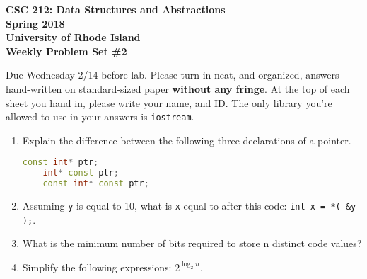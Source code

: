 \documentclass[11pt]{article}
\begin{document}
\thispagestyle{empty}

\begin{center}
    {\Large\bf CSC 212: Data Structures and Abstractions}\\
    \medskip
    {\Large\bf Spring 2018}\\
    \medskip
    {\Large\bf University of Rhode Island}\\
    \bigskip
    {\Large\bf Weekly Problem Set \#2}
\end{center}

Due Wednesday 2/14 before lab. Please turn in neat, and organized, answers hand-written on standard-sized paper \textbf{without any fringe}. At the top of each sheet you hand in, please write your name, and ID.
The only library you're allowed to use in your answers is \verb|iostream|.

\begin{enumerate}[leftmargin=*]

\item Explain the difference between the following three declarations of a pointer.  
\begin{lstlisting}[language=C++]
    const int* ptr;
    int* const ptr;
    const int* const ptr;
\end{lstlisting}

\item Assuming \lstinline|y| is equal to 10, what is \lstinline|x| equal to after this code: \verb|int x = *( &y );|.

\item What is the minimum number of bits required to store n distinct code values? 

\item Simplify the following expressions: 
\( 2^{\log_{2}n} \),


\end{enumerate}

\label{r:lastpage}
\end{document}
